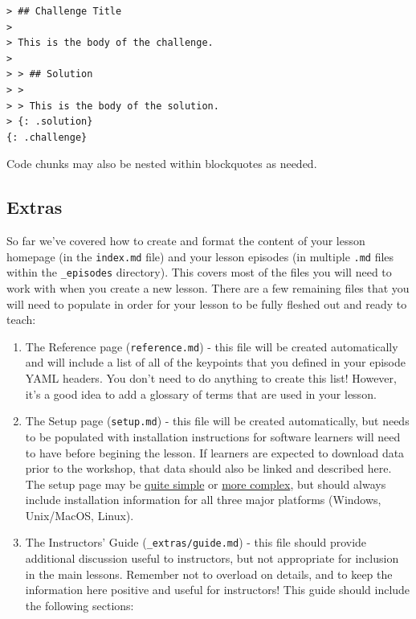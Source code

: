 \documentclass[
]{book}
\begin{document}
\begin{verbatim}
> ## Challenge Title
>
> This is the body of the challenge.
>
> > ## Solution
> >
> > This is the body of the solution.
> {: .solution}
{: .challenge}
\end{verbatim}

Code chunks may also be nested within blockquotes as needed.

\hypertarget{extras}{%
\subsection{Extras}\label{extras}}

So far we've covered how to create and format the content of your lesson homepage (in the \texttt{index.md} file)
and your lesson episodes (in multiple \texttt{.md} files within the \texttt{\_episodes} directory). This covers most of the
files you will need to work with when you create a new lesson. There are a few remaining files that you will
need to populate in order for your lesson to be fully fleshed out and ready to teach:

\begin{enumerate}
\def\labelenumi{\arabic{enumi}.}
\item
  The Reference page (\texttt{reference.md}) - this file will be created automatically and will include a list
  of all of the keypoints that you defined in your episode YAML headers. You don't need to do anything to create
  this list! However, it's a good idea to add a glossary of terms that are used in your lesson.
\item
  The Setup page (\texttt{setup.md}) - this file will be created automatically, but needs to be populated with
  installation instructions for software learners will need to have before begining the lesson. If learners are
  expected to download data prior to the workshop, that data should also be linked and described here. The setup
  page may be \href{http://swcarpentry.github.io/git-novice/setup.html}{quite simple} or
  \href{https://datacarpentry.org/geospatial-workshop/setup.html}{more complex}, but should
  always include installation information for all three major platforms (Windows, Unix/MacOS, Linux).
\item
  The Instructors' Guide (\texttt{\_extras/guide.md}) - this file should provide additional discussion useful to
  instructors,
  but not appropriate for inclusion in the main lessons. Remember not to overload on details, and to keep the
  information here positive and useful for instructors! This guide should include the following sections:
\end{enumerate}
\end{document}
